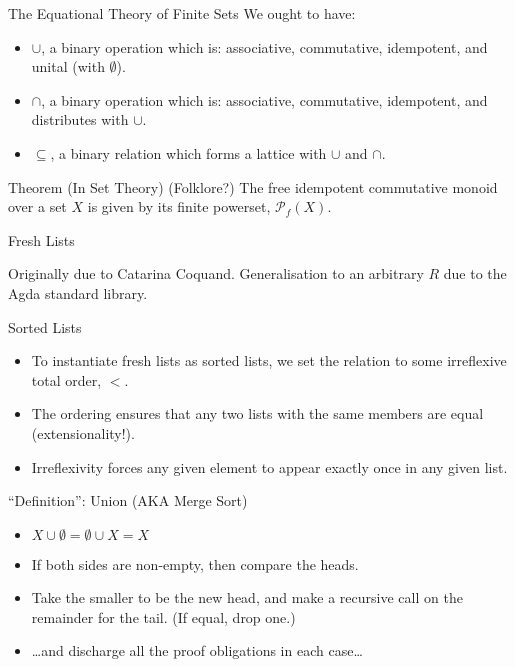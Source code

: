 \documentclass{beamer}
\begin{document}
\begin{frame}{The Equational Theory of Finite Sets}
We ought to have:
\begin{itemize}
\item $\cup$, a binary operation which is: associative, commutative, idempotent, and unital (with $\emptyset$).
\item $\cap$, a binary operation which is: associative, commutative, idempotent, and distributes with $\cup$.
\item $\subseteq$, a binary relation which forms a lattice with $\cup$ and $\cap$.
\end{itemize}

\begin{block}{Theorem (In Set Theory) (Folklore?)}
  The free idempotent commutative monoid over a set $X$ is given by its finite powerset, $\mathcal{P}_{f}(X)$.
\end{block}

\end{frame}


\begin{frame}{Fresh Lists}
  \snippetdatafreshlist{}

  Originally due to Catarina Coquand.
  Generalisation to an arbitrary $R$ due to the Agda standard library.
\end{frame}


\begin{frame}{Sorted Lists}

\begin{itemize}
  \item To instantiate fresh lists as sorted lists, we set the relation to some irreflexive total order, $<$.

  \item The ordering ensures that any two lists with the same members are equal (extensionality!).

  \item Irreflexivity forces any given element to appear exactly once in any given list.
\end{itemize}

\begin{block}{``Definition'': Union (AKA Merge Sort)}
\begin{itemize}
\item $X \cup \emptyset = \emptyset \cup X = X$
  \item If both sides are non-empty, then compare the heads.
  \item Take the smaller to be the new head, and make a recursive call on the remainder for the tail. (If equal, drop one.)
  \item \ldots{}and discharge all the proof obligations in each case\ldots{}
\end{itemize}
\end{block}
\end{frame}
\end{document}
